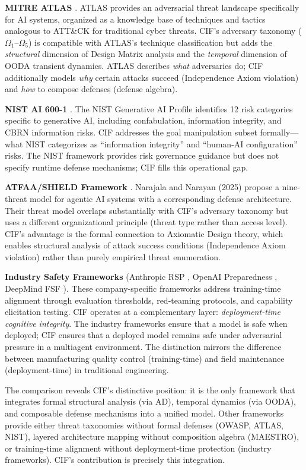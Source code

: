 \documentclass[
]{article}
\begin{document}
\textbf{MITRE ATLAS} \cite{mitre2023atlas}. ATLAS provides an
adversarial threat landscape specifically for AI systems, organized as a
knowledge base of techniques and tactics analogous to ATT\&CK for
traditional cyber threats. CIF's adversary taxonomy
(\(\Omega_1\)--\(\Omega_5\)) is compatible with ATLAS's technique
classification but adds the \emph{structural} dimension of Design Matrix
analysis and the \emph{temporal} dimension of OODA transient dynamics.
ATLAS describes \emph{what} adversaries do; CIF additionally models
\emph{why} certain attacks succeed (Independence Axiom violation) and
\emph{how} to compose defenses (defense algebra).

\textbf{NIST AI 600-1} \cite{nist2024genai}. The NIST Generative AI
Profile identifies 12 risk categories specific to generative AI,
including confabulation, information integrity, and CBRN information
risks. CIF addresses the goal manipulation subset formally---what NIST
categorizes as ``information integrity'' and ``human-AI configuration''
risks. The NIST framework provides risk governance guidance but does not
specify runtime defense mechanisms; CIF fills this operational gap.

\textbf{ATFAA/SHIELD Framework} \cite{narajala2025atfaa}. Narajala and
Narayan (2025) propose a nine-threat model for agentic AI systems with a
corresponding defense architecture. Their threat model overlaps
substantially with CIF's adversary taxonomy but uses a different
organizational principle (threat type rather than access level). CIF's
advantage is the formal connection to Axiomatic Design theory, which
enables structural analysis of attack success conditions (Independence
Axiom violation) rather than purely empirical threat enumeration.

\textbf{Industry Safety Frameworks} (Anthropic RSP
\cite{anthropic2024rsp}, OpenAI Preparedness
\cite{openai2025preparedness}, DeepMind FSF \cite{deepmind2025fsf}).
These company-specific frameworks address training-time alignment
through evaluation thresholds, red-teaming protocols, and capability
elicitation testing. CIF operates at a complementary layer:
\emph{deployment-time cognitive integrity}. The industry frameworks
ensure that a model is safe when deployed; CIF ensures that a deployed
model remains safe under adversarial pressure in a multiagent
environment. The distinction mirrors the difference between
manufacturing quality control (training-time) and field maintenance
(deployment-time) in traditional engineering.

The comparison reveals CIF's distinctive position: it is the only
framework that integrates formal structural analysis (via AD), temporal
dynamics (via OODA), and composable defense mechanisms into a unified
model. Other frameworks provide either threat taxonomies without formal
defenses (OWASP, ATLAS, NIST), layered architecture mapping without
composition algebra (MAESTRO), or training-time alignment without
deployment-time protection (industry frameworks). CIF's contribution is
precisely this integration.
\end{document}
